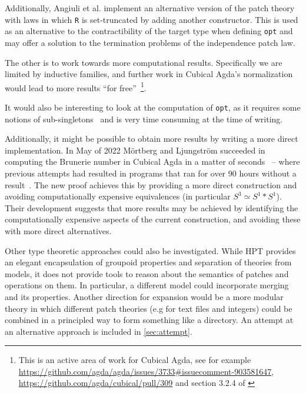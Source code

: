Additionally, Angiuli et al. implement an alternative version of the patch
theory with laws in which \texttt{R} is set-truncated by adding another
constructor. This is used as an alternative to the contractibility of the target
type when defining \texttt{opt} and may offer a solution to the termination
problems of the independence patch law.

The other is to work towards more computational results.
Specifically we are limited by inductive families, and further work in Cubical
Agda's normalization would lead to more results ``for free''~\footnote{This is
  an active area of work for Cubical Agda, see for example
  \url{https://github.com/agda/agda/issues/3733\#issuecomment-903581647},
  \url{https://github.com/agda/cubical/pull/309} and section 3.2.4 of \cite{vezzosi2021cubical}}.

It would also be interesting to look at the computation of \texttt{opt}, as it requires some
notions of sub-singletons~\cite{Angiuli2016} and is very time consuming at the
time of writing.

Additionally, it might be possible to obtain more results by writing a more
direct implementation. In May of 2022 M\"ortberg and Ljungstr\"om succeeded in
computing the Brunerie number in Cubical Agda in a matter of
seconds~\cite{ljungstrom2022} -- where previous attempts had resulted in
programs that ran for over 90 hours without a result~\cite{mortberg2018}. The
new proof achieves this by providing a more direct construction and avoiding
computationally expensive equivalences (in particular $S^3 \simeq S^1 \ast
S^1$). Their development suggests that more results may be achieved by
identifying the computationally expensive aspects of the current construction,
and avoiding these with more direct alternatives.

Other type theoretic approaches could also be investigated. While HPT provides
an elegant encapsulation of groupoid properties and separation of theories from
models, it does not provide tools to reason about the semantics of patches and
operations on them. In particular, a different model could incorporate merging and
its properties. Another direction for expansion would be a more modular theory
in which different patch theories (e.g for text files and integers) could be
combined in a principled way to form something like a directory.
An attempt at an alternative approach is included in \autoref{sec:attempt}.
